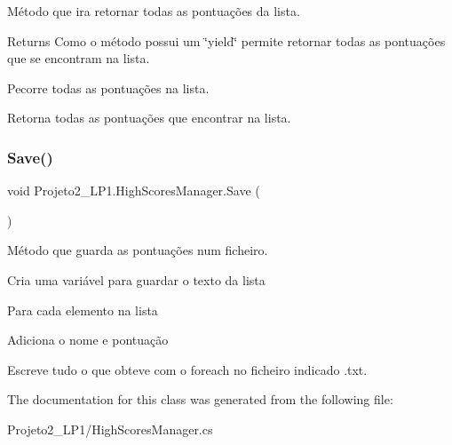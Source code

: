 Método que ira retornar todas as pontuações da lista. 

\begin{DoxyReturn}{Returns}
Como o método possui um \char`\"{}yield\char`\"{} permite retornar todas as pontuações que se encontram na lista.
\end{DoxyReturn}
Pecorre todas as pontuações na lista.

Retorna todas as pontuações que encontrar na lista. \mbox{\label{class_projeto2___l_p1_1_1_high_scores_manager_a24db9e36a1e0430ad3e8cf57492c0d1b}} 
\subsubsection{\texorpdfstring{Save()}{Save()}}
{\footnotesize\ttfamily void Projeto2\+\_\+\+L\+P1.\+High\+Scores\+Manager.\+Save (\begin{DoxyParamCaption}{ }\end{DoxyParamCaption})\hspace{0.3cm}{\ttfamily [inline]}}



Método que guarda as pontuações num ficheiro. 

Cria uma variável para guardar o texto da lista

Para cada elemento na lista

Adiciona o nome e pontuação

Escreve tudo o que obteve com o foreach no ficheiro indicado .txt. 

The documentation for this class was generated from the following file\+:\begin{DoxyCompactItemize}
\item 
Projeto2\+\_\+\+L\+P1/High\+Scores\+Manager.\+cs\end{DoxyCompactItemize}
